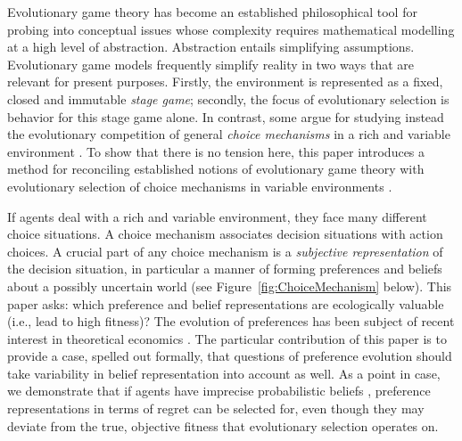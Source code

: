 \documentclass[fleqn,reqno,11pt]{article}
\begin{document}

Evolutionary game theory has become an established philosophical tool for probing into
conceptual issues whose complexity requires mathematical modelling at a high level of
abstraction.  Abstraction entails simplifying assumptions. Evolutionary game models frequently
simplify reality in two ways that are relevant for present purposes. Firstly, the environment
is represented as a fixed, closed and immutable \emph{stage game}; secondly, the focus of
evolutionary selection is behavior for this stage game alone. In contrast, some argue for
studying instead the evolutionary competition of general \emph{choice mechanisms} in a rich and
variable environment
\citep[e.g.,][]{FawcettHamblin2013:Exposing-the-be,McNamara2013:Towards-a-Riche}. To show that
there is no tension here, this paper introduces a method for reconciling established notions of
evolutionary game theory with evolutionary selection of choice mechanisms in variable
environments \citep[see related work
by][]{ZollmanSmead2010:Plasticity-and-,SmeadZollman2013:The-Stability-o}.

If agents deal with a rich and variable environment, they face many different choice
situations. A choice mechanism associates decision situations with action choices. A crucial
part of any choice mechanism is a \emph{subjective representation} of the decision situation,
in particular a manner of forming preferences and beliefs about a possibly uncertain world (see
Figure~\ref{fig:ChoiceMechanism} below). This paper asks: which preference and belief
representations are ecologically valuable (i.e., lead to high fitness)? The evolution of
preferences has been subject of recent interest in theoretical economics
\citep[e.g.,][]{algweib13,DekElyYlan07,RobSam11}. The particular contribution of this paper is
to provide a case, spelled out formally, that questions of preference evolution should take
variability in belief representation into account as well. As a point in case, we demonstrate
that if agents have imprecise probabilistic beliefs \citep[e.g.][]{gardsah82,levi74,walley96},
preference representations in terms of regret can be selected for, even though they may deviate
from the true, objective fitness that evolutionary selection operates on.
\end{document}
